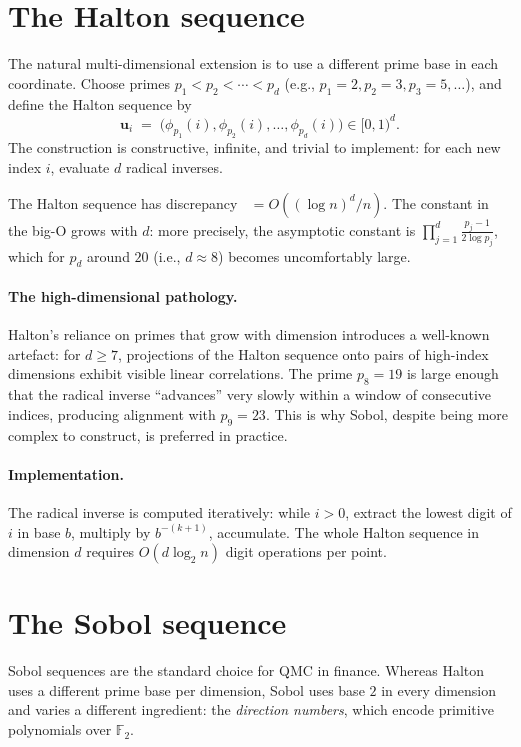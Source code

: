 \documentclass[11pt,a4paper]{article}
\theoremstyle{plain}
\theoremstyle{definition}
\theoremstyle{remark}
\DeclareMathOperator{\Disc}{D^*}
\begin{document}
\section{The Halton sequence}
\label{sec:halton}

The natural multi-dimensional extension is to use a different prime
base in each coordinate. Choose primes $p_1 < p_2 < \cdots < p_d$
(e.g., $p_1 = 2, p_2 = 3, p_3 = 5, \ldots$), and define the Halton
sequence by
\begin{equation}
\mathbf{u}_i \;=\; \bigl(\phi_{p_1}(i), \phi_{p_2}(i), \ldots,
                         \phi_{p_d}(i)\bigr) \in [0, 1)^d.
\end{equation}
The construction is constructive, infinite, and trivial to
implement: for each new index $i$, evaluate $d$ radical inverses.

The Halton sequence has discrepancy
$\Disc = O((\log n)^d / n)$. The constant in the big-O grows with
$d$: more precisely, the asymptotic constant is $\prod_{j=1}^d
\frac{p_j - 1}{2 \log p_j}$, which for $p_d$ around $20$ (i.e., $d
\approx 8$) becomes uncomfortably large.

\paragraph{The high-dimensional pathology.} Halton's reliance on
primes that grow with dimension introduces a well-known artefact:
for $d \geq 7$, projections of the Halton sequence onto pairs of
high-index dimensions exhibit visible linear correlations. The
prime $p_8 = 19$ is large enough that the radical inverse
``advances'' very slowly within a window of consecutive indices,
producing alignment with $p_9 = 23$. This is why Sobol, despite
being more complex to construct, is preferred in practice.

\paragraph{Implementation.} The radical inverse is computed
iteratively: while $i > 0$, extract the lowest digit of $i$ in base
$b$, multiply by $b^{-(k+1)}$, accumulate. The whole Halton
sequence in dimension $d$ requires $O(d \log_2 n)$ digit operations
per point.

\section{The Sobol sequence}
\label{sec:sobol}

Sobol sequences are the standard choice for QMC in finance.
Whereas Halton uses a different prime base per dimension, Sobol
uses base $2$ in every dimension and varies a different ingredient:
the \emph{direction numbers}, which encode primitive polynomials
over $\mathbb{F}_2$.
\end{document}
